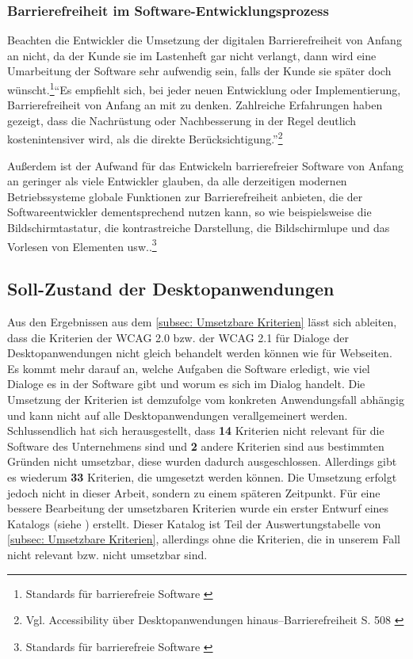 

\subsubsection{Barrierefreiheit im Software-Entwicklungsprozess}
Beachten die Entwickler die Umsetzung der digitalen Barrierefreiheit von Anfang an nicht, da der Kunde sie im Lastenheft gar nicht verlangt, dann wird eine Umarbeitung der Software sehr aufwendig sein, falls der Kunde sie später doch wünscht.\footnote{Standards für barrierefreie Software \cite{DEVINSIDER}}"`Es empfiehlt sich, bei jeder neuen Entwicklung oder Implementierung, Barrierefreiheit von Anfang an mit zu denken. Zahlreiche Erfahrungen haben gezeigt, dass die Nachrüstung oder Nachbesserung in der Regel deutlich kostenintensiver wird, als die direkte Berücksichtigung."'\footnote{Vgl. Accessibility über Desktopanwendungen hinaus–Barrierefreiheit S. 508 \cite{buhler2017accessibility}}
 
Außerdem ist der Aufwand für das Entwickeln barrierefreier Software von Anfang an geringer als viele Entwickler glauben, da alle  derzeitigen modernen Betriebssysteme globale Funktionen zur Barrierefreiheit anbieten, die der Softwareentwickler dementsprechend nutzen kann, so wie beispielsweise die Bildschirmtastatur, die kontrastreiche Darstellung, die Bildschirmlupe und das Vorlesen von Elementen usw..\footnote{Standards für barrierefreie Software \cite{DEVINSIDER}}

\subsection{Soll-Zustand der Desktopanwendungen}
\label{subsec: Soll-Zustand der Desktopanwendungen}

Aus den Ergebnissen aus dem \cref{subsec: Umsetzbare Kriterien} lässt sich ableiten, dass die Kriterien der \ac{WCAG} 2.0 bzw. der \ac{WCAG} 2.1 für Dialoge der Desktopanwendungen nicht gleich behandelt werden können wie für Webseiten. Es kommt mehr darauf an, welche Aufgaben die Software erledigt, wie viel Dialoge es in der Software gibt und worum es sich im Dialog handelt. Die Umsetzung der Kriterien ist demzufolge vom konkreten Anwendungsfall abhängig und kann nicht auf alle Desktopanwendungen verallgemeinert werden. Schlussendlich hat sich herausgestellt, dass \textbf{14} Kriterien nicht relevant für die Software des Unternehmens sind und \textbf{2} andere Kriterien sind aus bestimmten Gründen nicht umsetzbar, diese wurden dadurch ausgeschlossen. Allerdings gibt es wiederum \textbf{33} Kriterien, die umgesetzt werden können. Die Umsetzung erfolgt jedoch nicht in dieser Arbeit, sondern zu einem späteren Zeitpunkt. Für eine bessere Bearbeitung der umsetzbaren Kriterien wurde ein erster Entwurf eines Katalogs (siehe ) erstellt. Dieser Katalog ist Teil der Auswertungstabelle von \cref{subsec: Umsetzbare Kriterien}, allerdings ohne die Kriterien, die in unserem Fall nicht relevant bzw. nicht umsetzbar sind.

